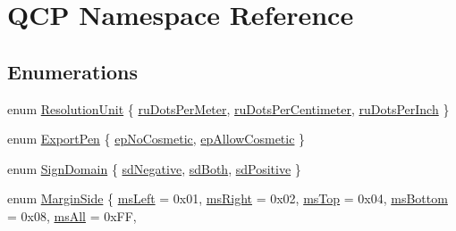 \hypertarget{namespace_q_c_p}{}\section{Q\+CP Namespace Reference}
\label{namespace_q_c_p}
\subsection*{Enumerations}
\begin{DoxyCompactItemize}
\item 
enum \hyperlink{namespace_q_c_p_a715d46153da230990aa887d0f0602452}{Resolution\+Unit} \{ \hyperlink{namespace_q_c_p_a715d46153da230990aa887d0f0602452a707d005dea5c4ab694e4270d9c6094e8}{ru\+Dots\+Per\+Meter}, 
\hyperlink{namespace_q_c_p_a715d46153da230990aa887d0f0602452a4224e01f49b331489ad8cb12b619b229}{ru\+Dots\+Per\+Centimeter}, 
\hyperlink{namespace_q_c_p_a715d46153da230990aa887d0f0602452affb887d8efe79c39a1aca2acd7002afc}{ru\+Dots\+Per\+Inch}
 \}
\item 
enum \hyperlink{namespace_q_c_p_a17844f19e1019693a953e1eb93536d2f}{Export\+Pen} \{ \hyperlink{namespace_q_c_p_a17844f19e1019693a953e1eb93536d2faae8fcfaafee234ce18558afef83f6a78}{ep\+No\+Cosmetic}, 
\hyperlink{namespace_q_c_p_a17844f19e1019693a953e1eb93536d2fa50d3657dba3fb90560b93a823cb0a6e8}{ep\+Allow\+Cosmetic}
 \}
\item 
enum \hyperlink{namespace_q_c_p_afd50e7cf431af385614987d8553ff8a9}{Sign\+Domain} \{ \hyperlink{namespace_q_c_p_afd50e7cf431af385614987d8553ff8a9a2d18af0bc58f6528d1e82ce699fe4829}{sd\+Negative}, 
\hyperlink{namespace_q_c_p_afd50e7cf431af385614987d8553ff8a9aa38352ef02d51ddfa4399d9551566e24}{sd\+Both}, 
\hyperlink{namespace_q_c_p_afd50e7cf431af385614987d8553ff8a9a584784b75fb816abcc627cf743bb699f}{sd\+Positive}
 \}
\item 
enum \hyperlink{namespace_q_c_p_a7e487e3e2ccb62ab7771065bab7cae54}{Margin\+Side} \{ \newline
\hyperlink{namespace_q_c_p_a7e487e3e2ccb62ab7771065bab7cae54a9500c8bfcc9e80b9dff0a8e00e867f07}{ms\+Left} = 0x01, 
\hyperlink{namespace_q_c_p_a7e487e3e2ccb62ab7771065bab7cae54a93c719593bb2b94ed244d52c86d83b65}{ms\+Right} = 0x02, 
\hyperlink{namespace_q_c_p_a7e487e3e2ccb62ab7771065bab7cae54a5db8fb0d0b0ecf0d611c2602a348e8a0}{ms\+Top} = 0x04, 
\hyperlink{namespace_q_c_p_a7e487e3e2ccb62ab7771065bab7cae54a5241d8eac2bab9524a38889f576179cc}{ms\+Bottom} = 0x08, 
\newline
\hyperlink{namespace_q_c_p_a7e487e3e2ccb62ab7771065bab7cae54a43d7361cb0c5244eabdc962021bffebc}{ms\+All} = 0x\+FF, 

\end{DoxyCompactItemize}
